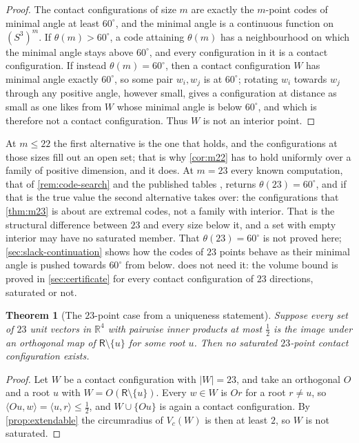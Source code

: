 \documentclass[11pt,reqno]{amsart}
\renewcommand{\_}{\origunderscore\allowbreak}
\numberwithin{equation}{section}
\theoremstyle{plain}
\newtheorem{thm}{Theorem}[section]
\theoremstyle{definition}
\theoremstyle{remark}
\newcommand{\Rt}{\mathsf{R}}                 %
\newcommand{\base}{u}                        %
\begin{document}
\begin{proof}
The contact configurations of size $m$ are exactly the $m$-point codes
of minimal angle at least $60^\circ$, and the minimal angle is a
continuous function on $(S^3)^m$. If $\theta(m)>60^\circ$, a code
attaining $\theta(m)$ has a neighbourhood on which the minimal angle
stays above $60^\circ$, and every configuration in it is a contact
configuration. If instead $\theta(m)=60^\circ$, then a contact
configuration $W$ has minimal angle exactly $60^\circ$, so some pair
$w_i,w_j$ is at $60^\circ$; rotating $w_i$ towards $w_j$ through any
positive angle, however small, gives a configuration at distance as
small as one likes from $W$ whose minimal angle is below $60^\circ$, and
which is therefore not a contact configuration. Thus $W$ is not an
interior point.
\end{proof}

At $m\le22$ the first alternative is the one that holds, and the
configurations at those sizes fill out an open set; that is why
\cref{cor:m22} has to hold uniformly over a family of positive
dimension, and it does. At $m=23$ every known computation, that of
\cref{rem:code-search} and the published tables \cite{Slo}, returns
$\theta(23)=60^\circ$, and if that is the true value the second
alternative takes over: the configurations that \cref{thm:m23} is about
are extremal codes, not a family with interior. That is the structural
difference between $23$ and every size below it, and a set with empty
interior may have no saturated member. That $\theta(23)=60^\circ$ is
not proved here; \cref{sec:slack-continuation} shows how the codes
of $23$ points behave as their minimal angle is pushed towards $60^\circ$
from below.  does not need it: the volume bound is proved
in \cref{sec:certificate} for every contact configuration of $23$
directions, saturated or not.

\begin{thm}[The $23$-point case from a uniqueness statement]\label{thm:m23-from-codes}
Suppose every set of $23$ unit vectors in $\mathbb{R}^4$ with pairwise
inner products at most $\tfrac12$ is the image under an orthogonal map
of $\Rt\setminus\{\base\}$ for some root $\base$. Then no saturated
$23$-point contact configuration exists.
\end{thm}

\begin{proof}
Let $W$ be a contact configuration with $|W|=23$, and take an orthogonal
$O$ and a root $\base$ with $W=O(\Rt\setminus\{\base\})$. Every $w\in W$
is $Or$ for a root $r\ne\base$, so
$\langle O\base,w\rangle=\langle\base,r\rangle\le\tfrac12$, and
$W\cup\{O\base\}$ is again a contact configuration. By
\cref{prop:extendable} the circumradius of $V_c(W)$ is then at least
$2$, so $W$ is not saturated.
\end{proof}
\end{document}
